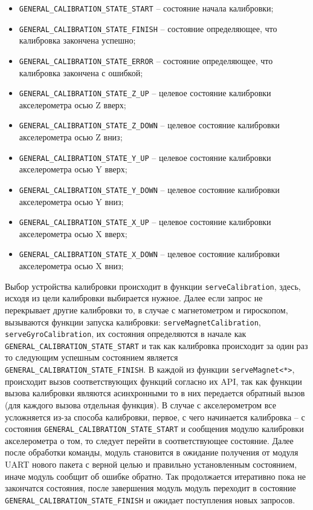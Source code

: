 \begin{itemize}
    \item \lstinline{GENERAL_CALIBRATION_STATE_START} -- состояние начала калибровки;
     \item \lstinline{GENERAL_CALIBRATION_STATE_FINISH} -- состояние определяющее, что калибровка закончена успешно;
     \item \lstinline{GENERAL_CALIBRATION_STATE_ERROR} -- состояние определяющее, что калибровка закончена с ошибкой;
     \item \lstinline{GENERAL_CALIBRATION_STATE_Z_UP} -- целевое состояние калибровки акселерометра осью Z вверх;
     \item \lstinline{GENERAL_CALIBRATION_STATE_Z_DOWN} -- целевое состояние калибровки акселерометра осью Z вниз; 
     \item \lstinline{GENERAL_CALIBRATION_STATE_Y_UP} -- целевое состояние калибровки акселерометра осью Y вверх; 
     \item \lstinline{GENERAL_CALIBRATION_STATE_Y_DOWN} -- целевое состояние калибровки акселерометра осью Y вниз; 
     \item \lstinline{GENERAL_CALIBRATION_STATE_X_UP} -- целевое состояние калибровки акселерометра осью X вверх; 
     \item \lstinline{GENERAL_CALIBRATION_STATE_X_DOWN} -- целевое состояние калибровки акселерометра осью X вниз; 
\end{itemize}

Выбор устройства калибровки происходит в функции \lstinline{serveCalibration}, здесь, исходя из цели калибровки выбирается нужное. Далее если запрос не
перекрывает другие калибровки то, в случае с магнетометром и гироскопом, вызываются функции запуска калибровки: \lstinline{serveMagnetCalibration},
\lstinline{serveGyroCalibration}, их состояния определяются в начале как \lstinline{GENERAL_CALIBRATION_STATE_START} и так как калибровка происходит за один раз
то следующим успешным состоянием является \lstinline{GENERAL_CALIBRATION_STATE_FINISH}. В каждой из функции \lstinline{serveMagnet<*>}, происходит вызов соответствующих
функций согласно их API, так как функции вызова калибровки являются асинхронными то в них передается обратный вызов (для каждого вызова отдельная функция).
В случае с акселерометром все усложняется из-за способа калибровки, первое, с чего начинается калибровка -- с состояния \lstinline{GENERAL_CALIBRATION_STATE_START} и
сообщения модулю калибровки акселерометра о том, то следует перейти в соответствующее состояние. Далее после обработки команды, модуль становится в ожидание получения
от модуля UART нового пакета с верной целью и правильно установленным состоянием, иначе модуль сообщит об ошибке обратно. Так продолжается итеративно пока не закончатся
состояния, после завершения модуль модуль переходит в состояние \lstinline{GENERAL_CALIBRATION_STATE_FINISH} и ожидает поступления новых запросов.

